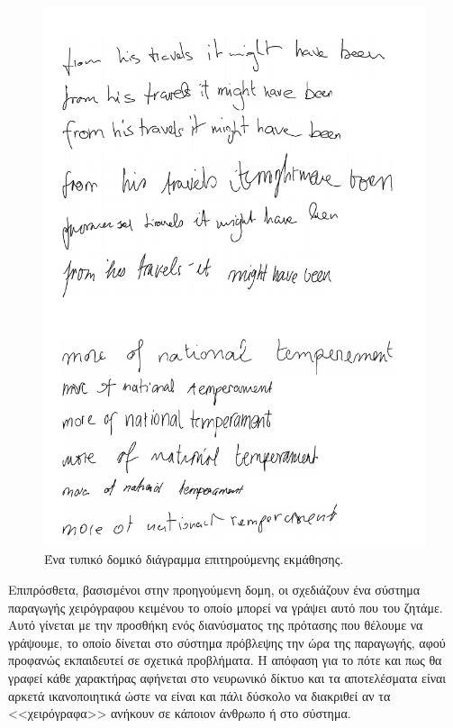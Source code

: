 \begin{figure}[tph]
	\includegraphics[width=\textwidth, keepaspectratio]{images/handwriting.png}
	\centering 
	\caption{Ένα τυπικό δομικό διάγραμμα επιτηρούμενης εκμάθησης.}
	\label{fig:training}
\end{figure}

Επιπρόσθετα, βασισμένοι στην προηγούμενη δομη, οι  σχεδιάζουν ένα σύστημα παραγωγής χειρόγραφου κειμένου το οποίο μπορεί να γράψει αυτό που του ζητάμε.
Αυτό γίνεται με την προσθήκη ενός διανύσματος της πρότασης που θέλουμε να γράψουμε, το οποίο δίνεται στο σύστημα πρόβλεψης την ώρα της παραγωγής, αφού προφανώς εκπαιδευτεί σε σχετικά προβλήματα.
Η απόφαση για το πότε και πως θα γραφεί κάθε χαρακτήρας αφήνεται στο νευρωνικό δίκτυο και τα αποτελέσματα είναι αρκετά ικανοποιητικά ώστε να είναι και πάλι δύσκολο να διακριθεί αν τα <<χειρόγραφα>> ανήκουν σε κάποιον άνθρωπο ή στο σύστημα.

